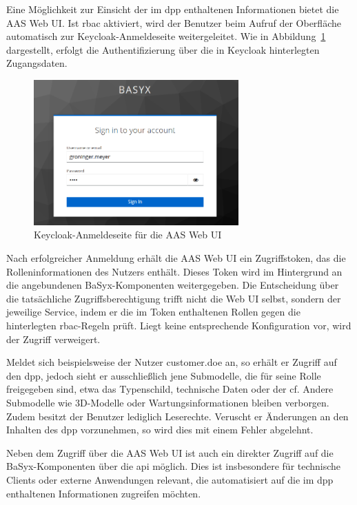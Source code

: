 Eine Möglichkeit zur Einsicht der im \acs{dpp} enthaltenen Informationen bietet die AAS Web UI.  
Ist \acs{rbac} aktiviert, wird der Benutzer beim Aufruf der Oberfläche automatisch zur Keycloak-Anmeldeseite weitergeleitet.  
Wie in Abbildung~\ref{fig:KeycloakAnmeldeSeite} dargestellt, erfolgt die Authentifizierung über die in Keycloak hinterlegten Zugangsdaten.

\begin{figure}[htbp]
    \centering
        \includegraphics[width=0.7\textwidth]{Bilder/Ergebnisse/DPP/KeycloakAnmeldeSeite.png}
    \caption{Keycloak-Anmeldeseite für die AAS Web UI}
    \label{fig:KeycloakAnmeldeSeite}
\end{figure}

Nach erfolgreicher Anmeldung erhält die AAS Web UI ein Zugriffstoken, das die Rolleninformationen des Nutzers enthält.  
Dieses Token wird im Hintergrund an die angebundenen BaSyx-Komponenten weitergegeben.  
Die Entscheidung über die tatsächliche Zugriffsberechtigung trifft nicht die Web UI selbst, sondern der jeweilige Service, indem er die im Token enthaltenen Rollen gegen die hinterlegten \acs{rbac}-Regeln prüft.  
Liegt keine entsprechende Konfiguration vor, wird der Zugriff verweigert.

Meldet sich beispielsweise der Nutzer customer.doe an, so erhält er Zugriff auf den \acs{dpp}, jedoch sieht er ausschließlich jene Submodelle, die für seine Rolle freigegeben sind, etwa das Typenschild, technische Daten oder der \acs{cf}.  
Andere Submodelle wie 3D-Modelle oder Wartungsinformationen bleiben verborgen.  
Zudem besitzt der Benutzer lediglich Leserechte.
Veruscht er Änderungen an den Inhalten des \acs{dpp} vorzunehmen, so wird dies mit einem Fehler abgelehnt.

Neben dem Zugriff über die AAS Web UI ist auch ein direkter Zugriff auf die BaSyx-Komponenten über die \acs{api} möglich. 
Dies ist insbesondere für technische Clients oder externe Anwendungen relevant, die automatisiert auf die im \acs{dpp} enthaltenen Informationen zugreifen möchten.

